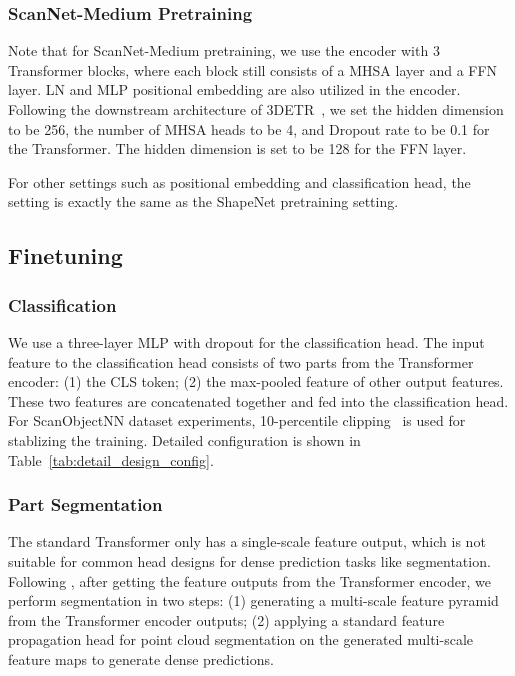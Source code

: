 \documentclass[runningheads]{llncs}
\begin{document}
\vspace{-10pt}
\subsubsection{ScanNet-Medium Pretraining}

Note that for ScanNet-Medium pretraining, we use the encoder with 3 Transformer blocks, where each block still consists of a MHSA layer and a FFN layer. LN and MLP positional embedding are also utilized in the encoder. Following the downstream architecture of 3DETR~\cite{misra2021-3detr}, we set the hidden dimension to be 256, the number of MHSA heads to be 4, and Dropout rate to be 0.1 for the Transformer. The hidden dimension is set to be 128 for the FFN layer. 

For other settings such as positional embedding and classification head, the setting is exactly the same as the ShapeNet pretraining setting. 
    
\subsection{Finetuning}

\subsubsection{Classification}
We use a three-layer MLP with dropout for the classification head. The input feature to the classification head consists of two parts from the Transformer encoder: (1) the CLS token; (2) the max-pooled feature of other output features. These two features are concatenated together and fed into the classification head. For ScanObjectNN dataset experiments, 10-percentile clipping~\cite{seetharaman2020autoclip} is used for stablizing the training.  Detailed configuration is shown in Table~\ref{tab:detail_design_config}.

\vspace{-10pt}
\subsubsection{Part Segmentation}
The standard Transformer only has a single-scale feature output, which is not suitable for common head designs for dense prediction tasks like segmentation.  Following \cite{yu2021point}, after getting the feature outputs from the Transformer encoder, we perform segmentation in two steps: (1) generating a multi-scale feature pyramid from the Transformer encoder outputs; (2) applying a standard feature propagation head for point cloud segmentation on the generated multi-scale feature maps to generate dense predictions.
\end{document}
